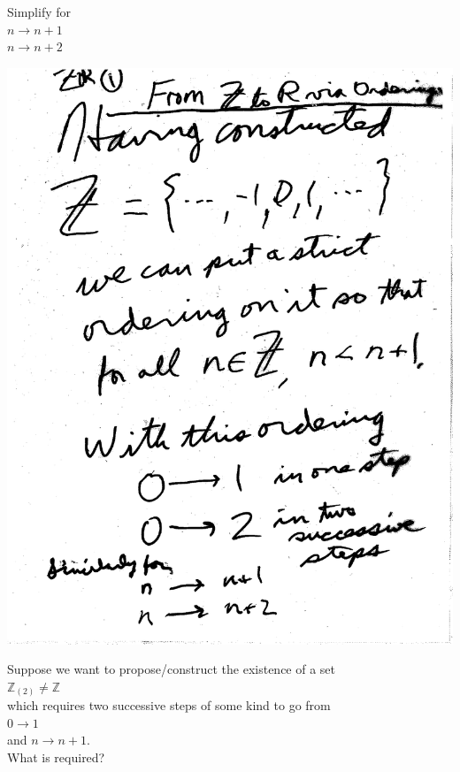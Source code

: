 \documentclass[10pt,a4paper]{article}
\begin{document}
{{Simplify for \\
	$n\rightarrow n+1$\\
	$n\rightarrow n+2$

\includegraphics[scale=0.5]{Pages/ZR_1}

\newpage

Suppose we want to propose/construct the existence of a set\\
$\mathbb{Z}_{(2)}\neq \mathbb{Z}$\\
which requires two successive steps of some kind to go from\\
$0 \rightarrow 1$\\
and $n\rightarrow n+1$.\\
What is required?

}}
\end{document}
